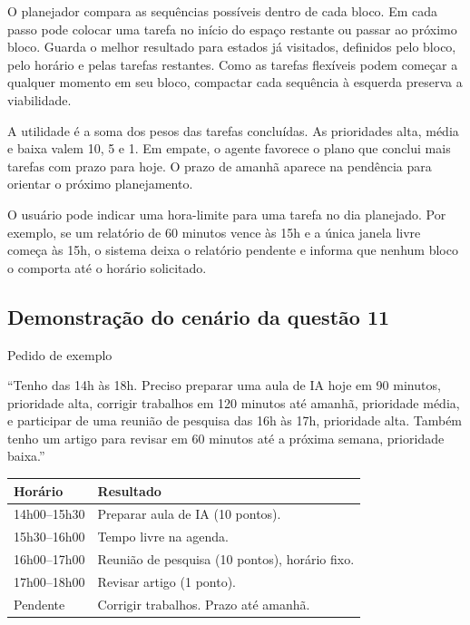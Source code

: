 \documentclass[12pt,a4paper]{article}
\begin{document}
O planejador compara as sequências possíveis dentro de cada bloco. Em cada passo pode colocar uma tarefa no início do espaço restante ou passar ao próximo bloco. Guarda o melhor resultado para estados já visitados, definidos pelo bloco, pelo horário e pelas tarefas restantes. Como as tarefas flexíveis podem começar a qualquer momento em seu bloco, compactar cada sequência à esquerda preserva a viabilidade.

A utilidade é a soma dos pesos das tarefas concluídas. As prioridades alta, média e baixa valem 10, 5 e 1. Em empate, o agente favorece o plano que conclui mais tarefas com prazo para hoje. O prazo de amanhã aparece na pendência para orientar o próximo planejamento.

O usuário pode indicar uma hora-limite para uma tarefa no dia planejado. Por exemplo, se um relatório de 60 minutos vence às 15h e a única janela livre começa às 15h, o sistema deixa o relatório pendente e informa que nenhum bloco o comporta até o horário solicitado.

\subsection{Demonstração do cenário da questão 11}

\noindent Pedido de exemplo

``Tenho das 14h às 18h. Preciso preparar uma aula de IA hoje em 90 minutos, prioridade alta, corrigir trabalhos em 120 minutos até amanhã, prioridade média, e participar de uma reunião de pesquisa das 16h às 17h, prioridade alta. Também tenho um artigo para revisar em 60 minutos até a próxima semana, prioridade baixa.''

\begin{table}[htbp]
    \centering
    \begin{tabular}{>{\raggedright\arraybackslash}p{3.6cm} >{\raggedright\arraybackslash}p{9.5cm}}
        \toprule
        \textbf{Horário} & \textbf{Resultado} \\
        \midrule
        14h00--15h30 & Preparar aula de IA (10 pontos). \\
        \addlinespace
        15h30--16h00 & Tempo livre na agenda. \\
        \addlinespace
        16h00--17h00 & Reunião de pesquisa (10 pontos), horário fixo. \\
        \addlinespace
        17h00--18h00 & Revisar artigo (1 ponto). \\
        \addlinespace
        Pendente & Corrigir trabalhos. Prazo até amanhã. \\
        \bottomrule
    \end{tabular}
\end{table}
\end{document}
